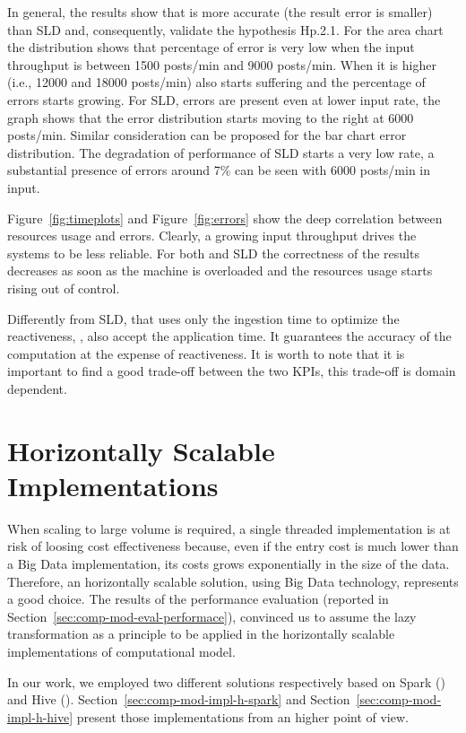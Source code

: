 In general, the results show that \sti{} is more accurate (the result error is smaller) than SLD and, consequently, validate the hypothesis \textsf{Hp.2.1}. For the area chart the distribution shows that \sti{} percentage of error is very low when the input throughput is between 1500 posts/min and 9000 posts/min. When it is higher (i.e., 12000 and  18000 posts/min) also \sti{} starts suffering and the percentage of errors starts growing. For SLD, errors are present even at lower input rate, the graph shows that the error distribution starts moving to the right at 6000 posts/min. Similar consideration can be proposed for the bar chart error distribution. The degradation of performance of SLD starts a very low rate, a substantial presence of errors around 7\% can be seen with 6000 posts/min in input.

Figure~\ref{fig:timeplots} and Figure~\ref{fig:errors} show the deep correlation between resources usage and errors. Clearly, a growing input throughput drives the systems to be less reliable. For both \sti{} and SLD the correctness of the results decreases as soon as the machine is overloaded and the resources usage starts rising out of control.

{\color{red}
Differently from SLD, that uses only the ingestion time to optimize the reactiveness, \sti{}, also accept the application time. It guarantees the accuracy of the computation at the expense of reactiveness. 
It is worth to note that it is important to find a good trade-off between the two KPIs, this trade-off is domain dependent. 
}

\section{Horizontally Scalable Implementations} \label{sec:comp-mod-impl-h}
When scaling to large volume is required, a single threaded implementation is at risk of loosing cost effectiveness because, even if the entry cost is much lower than a Big Data implementation, its costs grows exponentially in the size of the data. Therefore, an horizontally scalable solution, using Big Data technology, represents a good choice.
The results of the performance evaluation (reported in Section~\ref{sec:comp-mod-eval-performace}), convinced us to assume the \textsf{lazy transformation} as a principle to be applied in the horizontally scalable implementations of \river{} computational model.

In our work, we employed two different solutions respectively based on Spark (\sparkdi{}) and Hive (\hivedi{}).
Section~\ref{sec:comp-mod-impl-h-spark} and Section~\ref{sec:comp-mod-impl-h-hive} present those implementations from an higher point of view.

